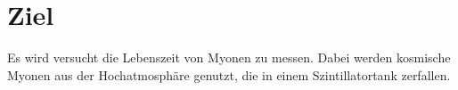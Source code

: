 \section{Ziel}
\label{sec:ziel}
Es wird versucht die Lebenszeit von Myonen zu messen. Dabei werden kosmische Myonen aus der Hochatmosphäre genutzt, die in einem Szintillatortank zerfallen.